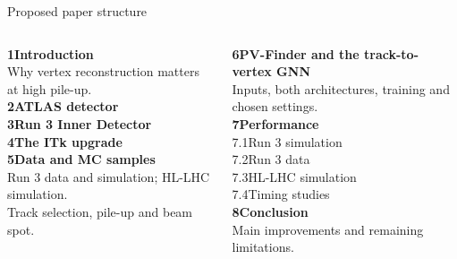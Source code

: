 \documentclass[xcolor=table,aspectratio=169]{beamer}
\newcommand{\takeaway}[1]{\par\vspace{.65em}{\centering
  \setlength{\fboxsep}{7pt}\colorbox{pennred!5}{\parbox{.94\linewidth}{%
  \centering\small\textcolor{pennred}{#1}}}\par}}
\begin{document}
\begin{frame}{Proposed paper structure}
\begin{columns}[T]
\begin{column}{.45\linewidth}
\small
\textbf{1\quad Introduction}\\[.45em]
Why vertex reconstruction matters at high pile-up.\\[1em]
\textbf{2\quad ATLAS detector}\\[.6em]
\textbf{3\quad Run 3 Inner Detector}\\[.6em]
\textbf{4\quad The ITk upgrade}\\[1em]
\textbf{5\quad Data and MC samples}\\[.45em]
Run 3 data and simulation; HL-LHC simulation.\\[.35em]
Track selection, pile-up and beam spot.
\end{column}
\begin{column}{.51\linewidth}
\small
\textbf{6\quad PV-Finder and the track-to-vertex GNN}\\[.45em]
Inputs, both architectures, training and chosen settings.\\[1em]
\textbf{7\quad Performance}\\[.45em]
7.1\quad Run 3 simulation\\[.3em]
7.2\quad Run 3 data\\[.3em]
7.3\quad HL-LHC simulation\\[.3em]
7.4\quad Timing studies\\[1em]
\textbf{8\quad Conclusion}\\[.45em]
Main improvements and remaining limitations.
\end{column}
\end{columns}
\takeaway{Describe both algorithms in Section 6; compare their performance with AMVF in Section 7.}
\end{frame}
\end{document}
